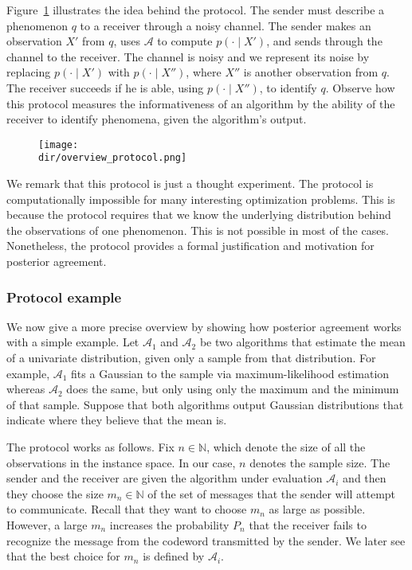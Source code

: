 Figure~\ref{fig:overview_protocol} illustrates the idea behind the protocol. The sender must describe a phenomenon $q$ to a receiver through a noisy channel. The sender makes an observation $X'$ from $q$, uses $\mathcal{A}$ to compute $p(\cdot \mid X')$, and sends through the channel to the receiver. The channel is noisy and we represent its noise by replacing $p(\cdot \mid X')$ with $p(\cdot \mid X'')$, where $X''$ is another observation from $q$. The receiver succeeds if he is able, using $p(\cdot \mid X'')$, to identify $q$. Observe how this protocol measures the informativeness of an algorithm by the ability of the receiver to identify phenomena, given the algorithm's output.

\begin{figure}
\texttt{[image: \\dir/overview\_protocol.png]}
\caption{}
\label{fig:overview_protocol}
\end{figure}

We remark that this protocol is just a thought experiment. The protocol is computationally impossible for many interesting optimization problems. This is because the protocol requires that we know the underlying distribution behind the observations of one phenomenon. This is not possible in most of the cases. Nonetheless, the protocol provides a formal justification and motivation for posterior agreement.

\subsubsection*{Protocol example}

We now give a more precise overview by showing how posterior agreement works with a simple example. Let $\mathcal{A}_1$ and $\mathcal{A}_2$ be two algorithms that estimate the mean of a univariate distribution, given only a sample from that distribution. For example, $\mathcal{A}_1$ fits a Gaussian to the sample via maximum-likelihood estimation whereas $\mathcal{A}_2$ does the same, but only using only the maximum and the minimum of that sample. Suppose that both algorithms output Gaussian distributions that indicate where they believe that the mean is. 

The protocol works as follows. Fix $n \in \mathbb{N}$, which denote the size of all the observations in the instance space. In our case, $n$ denotes the sample size. The sender and the receiver are given the algorithm under evaluation $\mathcal{A}_i$ and then they choose the size $m_n \in \mathbb{N}$ of the set of messages that the sender will attempt to communicate. Recall that they want to choose $m_n$ as large as possible. However, a large $m_n$ increases the probability $P_n$ that the receiver fails to recognize the message from the codeword transmitted by the sender. We later see that the best choice for $m_n$ is defined by $\mathcal{A}_i$. 

